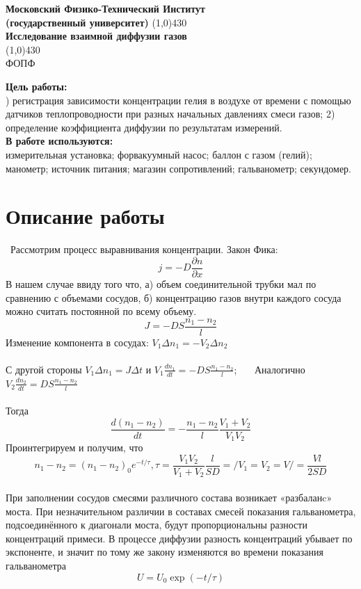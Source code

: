 \documentclass[11pt]{article}
\begin{document}
\begin{titlepage}
\begin{center}
\large\textbf{Московский Физико-Технический Институт}\\
\large\textbf{(государственный университет)}
\vfill
\line(1,0){430}\\[1mm]
\huge\textbf{Исследование взаимной диффузии газов}\\
\line(1,0){430}\\[1mm]
\vfill
\large ФОПФ\\
\end{center}
\end{titlepage}
\noindent \textbf{Цель работы:} \\
)  регистрация  зависимости  концентрации   гелия в воздухе от времени с помощью датчиков теплопроводности при разных начальных давлениях смеси газов; 2) определение коэффициента диффузии по результатам измерений.\\
\noindent \textbf{В работе используются:} \\
\indent измерительная установка; форвакуумный насос; баллон с газом (гелий); манометр; источник питания; магазин сопротивлений; гальванометр; секундомер.
\section*{Описание работы}\
\indent Рассмотрим процесс выравнивания концентрации. Закон Фика:
$$j=-D\frac{\partial n}{\partial x}$$
В нашем случае ввиду того что, а) объем соединительной трубки мал по сравнению с объемами сосудов, б) концентрацию газов внутри каждого сосуда можно считать постоянной по всему объему.
$$J=-DS\frac{n_1-n_2}{l}$$
Изменение компонента в сосудах: $V_1\Delta n_1=-V_2\Delta n_2$\\
\ \\
С другой стороны $V_1\Delta n_1=J\Delta t$ и $V_1\frac{dn_1}{dt}=-DS\frac{n_1-n_2}{l}$; \ \ \  Аналогично $V_2\frac{dn_2}{dt}=DS\frac{n_1-n_2}{l}$\\
\ \\
Тогда $$\frac{d(n_1-n_2)}{dt}=-\frac{n_1-n_2}{l} \frac{V_1+V_2}{V_1V_2}$$
Проинтегрируем и получим, что
$$n_1-n_2=(n_1-n_2)_0 e^{-t/\tau}, \tau=\frac{V_1V_2}{V_1+V_2}\frac{l}{SD}=/V_1=V_2=V/=\frac{Vl}{2SD}$$\\
 При заполнении сосудов смесями различного состава возникает «разбаланc» моста. При незначительном различии в составах смесей показания гальванометра, подсоединённого к диагонали моста, будут пропорциональны разности концентраций примеси. В процессе диффузии
разность концентраций убывает по экспоненте, и значит по тому же закону изменяются во времени показания гальванометра
$$U=U_0 \exp(-t/\tau)$$
\end{document}
